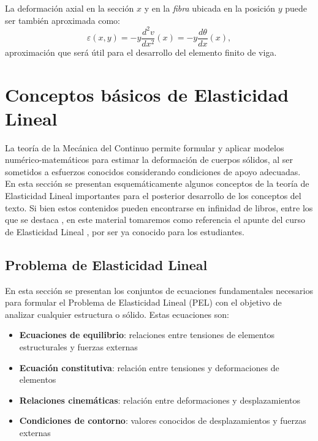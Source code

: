 La deformación axial en la sección $x$ y en la \textit{fibra} ubicada en la posición $y$ puede ser también aproximada como:
\begin{equation}\label{eqn:epstimo}
\boxed{
	\varepsilon(x,y) = -y \frac{d^2 v}{d x^2} (x) = -y \frac{d \theta}{d x} (x),
}
\end{equation}
%
aproximación que será útil para el desarrollo del elemento finito de viga.




\section{Conceptos básicos de Elasticidad Lineal}

La teoría de la Mecánica del Continuo permite formular y aplicar modelos numérico-matemáticos para estimar la deformación de cuerpos sólidos, al ser sometidos a esfuerzos conocidos considerando condiciones de apoyo adecuadas. %
%
En esta sección se presentan esquemáticamente algunos conceptos de la teoría de Elasticidad Lineal importantes para el posterior desarrollo de los conceptos del texto. %
%
Si bien estos contenidos pueden encontrarse en infinidad de libros, entre los que se destaca \citep{Gurtin1981}, en este material tomaremos como referencia el apunte del curso de Elasticidad Lineal \citep{CanelasElasticidad}, por ser ya conocido para los estudiantes.


\subsection{Problema de Elasticidad Lineal}

En esta sección se presentan los conjuntos de ecuaciones fundamentales necesarios para formular el Problema de Elasticidad Lineal (PEL) con el objetivo de analizar cualquier estructura o sólido. Estas ecuaciones son:
\begin{itemize}
\item \textbf{Ecuaciones de equilibrio}: relaciones entre  tensiones de elementos estructurales y fuerzas externas
\item \textbf{Ecuación constitutiva}: relación entre tensiones y deformaciones de elementos
\item \textbf{Relaciones cinemáticas}: relación entre deformaciones y desplazamientos
\item \textbf{Condiciones de contorno}: valores conocidos de desplazamientos y fuerzas externas
\end{itemize}

